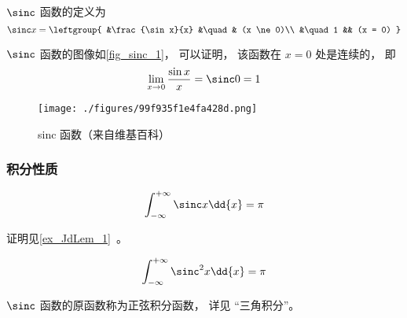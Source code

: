 

$\sinc$ 函数的定义为
\begin{equation}
\sinc x = 
\leftgroup{
&\frac{\sin x}{x} &\quad & (x \ne 0)\\
&\quad 1 && (x = 0)
}\end{equation}

$\sinc$ 函数的图像如\autoref{fig_sinc_1}， 可以证明， 该函数在 $x=0$ 处是连续的， 即
\begin{equation}
\lim_{x \to 0}\frac{\sin x}{x} = \sinc 0 = 1
\end{equation}

\begin{figure}[ht]
\centering
\texttt{[image: ./figures/99f935f1e4fa428d.png]}
\caption{sinc 函数（来自维基百科）} \label{fig_sinc_1}
\end{figure}

\subsubsection{积分性质}
\begin{equation}\label{eq_sinc_2}
\int_{-\infty}^{+\infty} \sinc x \dd{x} = \pi
\end{equation}

证明见\autoref{ex_JdLem_1}~。

\begin{equation}\label{eq_sinc_1}
\int_{-\infty}^{+\infty} \sinc^2 x \dd{x} = \pi
\end{equation}

$\sinc$ 函数的原函数称为正弦积分函数， 详见 “三角积分”。

